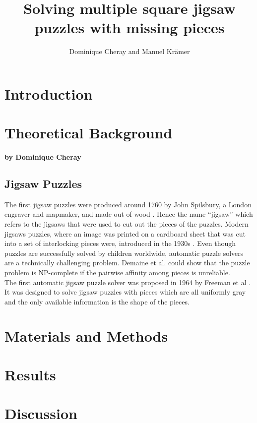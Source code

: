 \documentclass[]{report}
\title{Solving multiple square jigsaw puzzles with missing pieces}
\author{Dominique Cheray and Manuel Krämer}
\begin{document}
\maketitle

\begin{abstract}
\end{abstract}

\chapter{Introduction}

\chapter{Theoretical Background}
\subsubsection*{by Dominique Cheray}
\section{Jigsaw Puzzles}
The first jigsaw puzzles were produced around 1760 by John Spilsbury, a
London engraver and mapmaker, and made out of wood \cite{sholomon2013genetic}.
Hence the name ``jigsaw'' which refers to the jigsaws that were used to cut out
the pieces of the puzzles. Modern jigsaws puzzles, where an image was printed on
a cardboard sheet that was cut into a set of interlocking pieces were, introduced
in the 1930s \cite{williams2004jigsaw}. Even though puzzles are successfully
solved by children worldwide, automatic puzzle solvers are a technically
challenging problem. Demaine et al. \cite{demaine2007jigsaw} could show that the
puzzle problem is NP-complete if the pairwise affinity among pieces is
unreliable. \\
The first automatic jigsaw puzzle solver was proposed in 1964 by Freeman et al
\cite{freeman1964apictorial}. It was designed to solve jigsaw puzzles with
pieces which are all uniformly gray and the only available information is the
shape of the pieces. 

\chapter{Materials and Methods}

\chapter{Results}

\chapter{Discussion}

\nocite{*}

\newpage
{}

\end{document}
